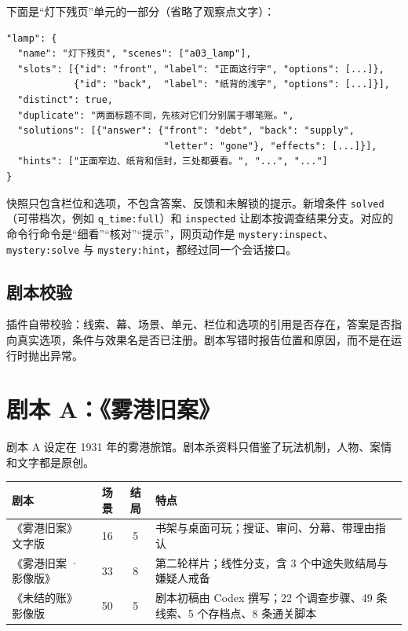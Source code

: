 \documentclass[11pt,a4paper,fontset=mac]{ctexart}
\begin{document}
下面是“灯下残页”单元的一部分（省略了观察点文字）：

\begin{Verbatim}
"lamp": {
  "name": "灯下残页", "scenes": ["a03_lamp"],
  "slots": [{"id": "front", "label": "正面这行字", "options": [...]},
            {"id": "back",  "label": "纸背的浅字", "options": [...]}],
  "distinct": true,
  "duplicate": "两面标题不同，先核对它们分别属于哪笔账。",
  "solutions": [{"answer": {"front": "debt", "back": "supply",
                            "letter": "gone"}, "effects": [...]}],
  "hints": ["正面窄边、纸背和信封，三处都要看。", "...", "..."]
}
\end{Verbatim}

快照只包含栏位和选项，不包含答案、反馈和未解锁的提示。新增条件 \texttt{solved}（可带档次，例如 \texttt{q\_time:full}）和 \texttt{inspected} 让剧本按调查结果分支。对应的命令行命令是“细看”“核对”“提示”，网页动作是 \texttt{mystery:inspect}、\texttt{mystery:solve} 与 \texttt{mystery:hint}，都经过同一个会话接口。

\subsection{剧本校验}

插件自带校验：线索、幕、场景、单元、栏位和选项的引用是否存在，答案是否指向真实选项，条件与效果名是否已注册。剧本写错时报告位置和原因，而不是在运行时抛出异常。

\section{剧本 A：《雾港旧案》}

剧本 A 设定在 1931 年的雾港旅馆。剧本杀资料只借鉴了玩法机制，人物、案情和文字都是原创。

\begin{table}[h]
\centering
\begin{tabularx}{\linewidth}{@{}p{3.7cm}ccL@{}}
\toprule
剧本 & 场景 & 结局 & 特点 \\
\midrule
《雾港旧案》文字版 & 16 & 5 & 书架与桌面可玩；搜证、审问、分幕、带理由指认 \\
《雾港旧案 · 影像版》 & 33 & 8 & 第二轮样片；线性分支，含 3 个中途失败结局与嫌疑人戒备 \\
《未结的账》影像版 & 50 & 5 & 剧本初稿由 Codex 撰写；22 个调查步骤、49 条线索、5 个存档点、8 条通关脚本 \\
\bottomrule
\end{tabularx}
\end{table}
\end{document}
